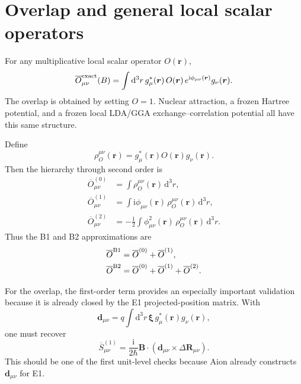 \documentclass[11pt]{article}
\newcommand{\ii}{\mathrm{i}}
\newcommand{\dd}{\mathrm{d}}
\newcommand{\vect}[1]{\bm{#1}}
\begin{document}
\section{Overlap and general local scalar operators}

For any multiplicative local scalar operator $O(\vect r)$,
\begin{equation}
\overline O_{\mu\nu}^{\rm exact}(B)
=\int \dd^3r\,
 g_\mu^*(\vect r)\,
 O(\vect r)\,
 e^{\ii\phi_{\mu\nu}(\vect r)}
 g_\nu(\vect r).
\label{eq:localexact}
\end{equation}
The overlap is obtained by setting $O=1$.  Nuclear attraction, a frozen Hartree potential, and a frozen local LDA/GGA exchange--correlation potential all have this same structure.

Define
\begin{equation}
\rho_O^{\mu\nu}(\vect r)
=g_\mu^*(\vect r)O(\vect r)g_\nu(\vect r).
\end{equation}
Then the hierarchy through second order is
\begin{align}
\overline O^{(0)}_{\mu\nu}
&=\int \rho_O^{\mu\nu}(\vect r)\,\dd^3r,\\
\overline O^{(1)}_{\mu\nu}
&=\int \ii\phi_{\mu\nu}(\vect r)\,
\rho_O^{\mu\nu}(\vect r)\,\dd^3r,\\
\overline O^{(2)}_{\mu\nu}
&=-\frac12\int \phi_{\mu\nu}^2(\vect r)\,
\rho_O^{\mu\nu}(\vect r)\,\dd^3r.
\end{align}
Thus the B1 and B2 approximations are
\begin{align}
\overline O^{\rm B1}&=\overline O^{(0)}+\overline O^{(1)},\\
\overline O^{\rm B2}&=\overline O^{(0)}+\overline O^{(1)}+\overline O^{(2)}.
\end{align}

For the overlap, the first-order term provides an especially important validation because it is already closed by the E1 projected-position matrix.  With
\begin{equation}
\vect d_{\mu\nu}
=q\int \dd^3r\,
\vect\xi\,g_\mu^*(\vect r)g_\nu(\vect r),
\end{equation}
one must recover
\begin{equation}
\boxed{
\overline S^{(1)}_{\mu\nu}
=\frac{\ii}{2\hbar}
\vect B\cdot
\left(\vect d_{\mu\nu}\times\Delta\vect R_{\mu\nu}\right).}
\label{eq:S1dip}
\end{equation}
This should be one of the first unit-level checks because Aion already constructs $\vect d_{\mu\nu}$ for E1.
\end{document}

